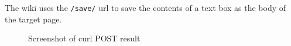 The wiki uses the {\tt/save/} url to save the contents of a text box as the body of the target page. 

\begin{figure}[h!]
\centering
\label{fig:curl_ss}
\caption{Screenshot of curl POST result}
\end{figure}